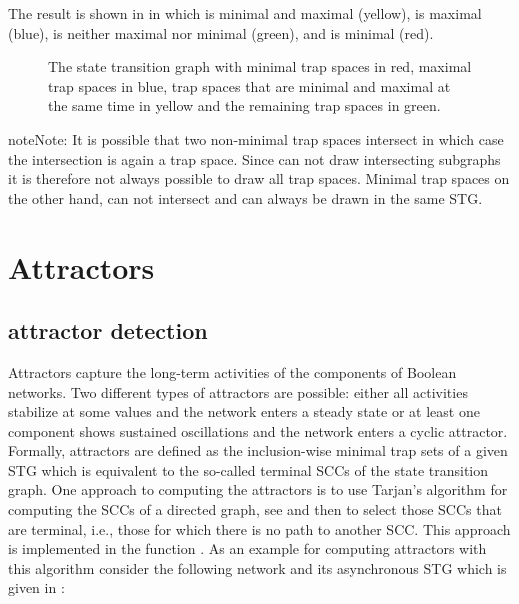 \documentclass[letterpaper,10pt,english]{sphinxmanual}
\begin{document}
The result is shown in {\hyperref[\detokenize{Manual:figure24}]{}} in which  is minimal and maximal (yellow),
 is maximal (blue),  is neither maximal nor minimal (green), and  is minimal (red).

\begin{figure}[htbp]
\centering
\capstart

\noindent{}
\caption{The state transition graph  with minimal trap spaces in red, maximal trap spaces in blue,
trap spaces that are minimal and maximal at the same time in yellow and the remaining trap spaces in green.}\label{\detokenize{Manual:figure24}}\label{\detokenize{Manual:id28}}\end{figure}

\begin{sphinxadmonition}{note}{Note:}
It is possible that two non-minimal trap spaces intersect in which case the intersection is again a trap space.
Since {\hyperref[\detokenize{Installation:installation-graphviz}]{}} can not draw intersecting subgraphs it is therefore not always possible to draw all trap spaces.
Minimal trap spaces on the other hand, can not intersect and can always be drawn in the same STG.
\end{sphinxadmonition}


\section{Attractors}
\label{\detokenize{Manual:attractors}}

\subsection{attractor detection}
\label{\detokenize{Manual:attractor-detection}}
Attractors capture the long-term activities of the components of Boolean networks.
Two different types of attractors are possible: either all activities stabilize at some values and the network enters a steady state or at least one component shows sustained oscillations and the network enters a cyclic attractor.
Formally, attractors are defined as the inclusion-wise minimal trap sets of a given STG which is equivalent to the so-called terminal SCCs of the state transition graph.
One approach to computing the attractors is to use Tarjan’s algorithm for computing the SCCs of a directed graph, see {\hyperref[\detokenize{Bibliography:tarjan1972}]{}} and then to select those SCCs that are terminal, i.e., those for which there is no path to another SCC.
This approach is implemented in the function {\hyperref[\detokenize{Attractors:compute-attractors-tarjan}]{}}.
As an example for computing attractors with this algorithm consider the following network and its asynchronous STG which is given in {\hyperref[\detokenize{Manual:figure25}]{}}:
\end{document}
